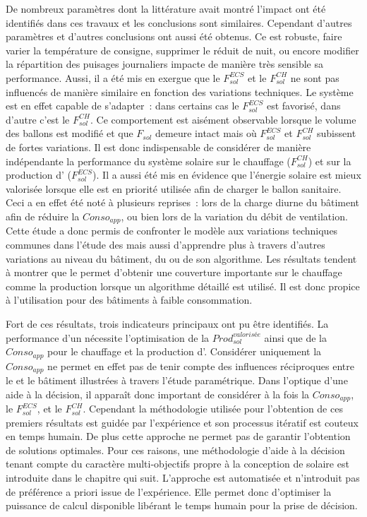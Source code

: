 De nombreux paramètres dont la littérature avait montré l’impact ont été identifiés dans
ces travaux et les conclusions sont similaires. Cependant d’autres paramètres et d’autres
conclusions ont aussi été obtenus. Ce  est robuste, faire varier la température de
consigne, supprimer le réduit de nuit, ou encore modifier la répartition des puisages
journaliers impacte de manière très sensible sa performance. Aussi, il a été mis en exergue que
le $F_{sol}^{ECS}$ et le $F_{sol}^{CH}$ ne sont pas influencés de manière similaire en
fonction des variations techniques. Le système est en effet capable de s’adapter~: dans
certains cas le $F_{sol}^{ECS}$ est favorisé, dans d’autre c’est le $F_{sol}^{CH}$. Ce
comportement est aisément observable lorsque le volume des ballons est modifié et que
$F_{sol}$ demeure intact mais où $F_{sol}^{ECS}$ et $F_{sol}^{CH}$ subissent de fortes
variations. Il est donc indispensable de considérer de manière indépendante la performance
du système solaire sur le chauffage ($F_{sol}^{CH}$) et sur la production d’
($F_{sol}^{ECS}$). Il a aussi été mis en évidence que l’énergie solaire est mieux
valorisée lorsque elle est en priorité utilisée afin de charger le ballon
sanitaire. Ceci a en effet été noté à plusieurs reprises~: lors de la charge diurne du
bâtiment afin de réduire la $Conso_{app}$, ou bien lors de la variation du débit de
ventilation. Cette étude a donc permis de confronter le modèle aux variations techniques
communes dans l’étude des  mais aussi d’apprendre plus à travers d’autres variations
au niveau du bâtiment, du  ou de son algorithme. Les résultats tendent à
montrer que le  permet d’obtenir une couverture importante sur le chauffage comme la
production  lorsque un algorithme détaillé est utilisé. Il est donc propice à
l’utilisation pour des bâtiments à faible consommation.

Fort de ces résultats, trois indicateurs principaux ont pu être identifiés. La performance
d’un  nécessite l’optimisation de la $Prod_{sol}^{valorisée}$ ainsi que de la
$Conso_{app}$ pour le chauffage et la production d’. Considérer uniquement la
$Conso_{app}$ ne permet en effet pas de tenir compte des influences réciproques entre le
 et le bâtiment illustrées à travers l’étude paramétrique. Dans l’optique d’une
aide à la décision, il apparaît donc important de considérer à la fois la $Conso_{app}$,
le $F_{sol}^{ECS}$, et le $F_{sol}^{CH}$. Cependant la méthodologie utilisée pour
l’obtention de ces premiers résultats est guidée par l’expérience et son processus
itératif est couteux en temps humain. De plus cette approche ne permet pas de garantir
l’obtention de solutions optimales. Pour ces raisons, une méthodologie d’aide à la
décision tenant compte du caractère multi-objectifs propre à la conception de 
solaire est introduite dans le chapitre qui suit. L’approche est automatisée et
n’introduit pas de préférence a priori issue de l’expérience. Elle permet donc d’optimiser
la puissance de calcul disponible libérant le temps humain pour la prise de décision.
